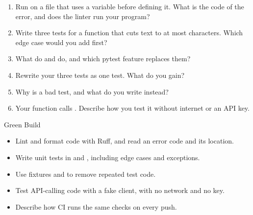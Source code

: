 \begin{practice}
\begin{enumerate}[leftmargin=*,itemsep=2pt]
\item Run  on a file that uses a variable before defining it. What is the code of the error, and does the linter run your program?
\item Write three  tests for a function  that cuts text to at most  characters. Which edge case would you add first?
\item What do  and  do, and which pytest feature replaces them?
\item Rewrite your three tests as one  test. What do you gain?
\item Why is  a bad test, and what do you write instead?
\item Your function calls . Describe how you test it without internet or an API key.
\end{enumerate}
\end{practice}

\begin{achievement}{Green Build}
\begin{itemize}[leftmargin=*,itemsep=1pt]
\item Lint and format code with Ruff, and read an error code and its location.
\item Write unit tests in  and , including edge cases and exceptions.
\item Use fixtures and  to remove repeated test code.
\item Test API-calling code with a fake client, with no network and no key.
\item Describe how CI runs the same checks on every push.
\end{itemize}
\end{achievement}


